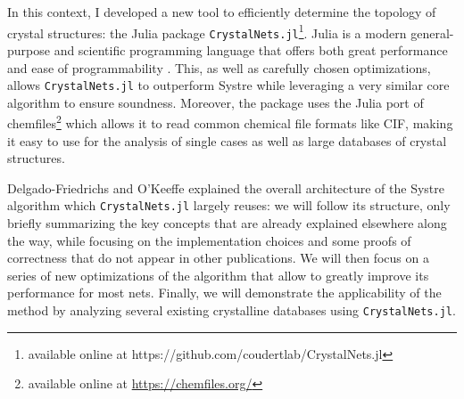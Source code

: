 \documentclass[main.tex]{subfiles}
\begin{document}

\medskip

In this context, I developed a new tool to efficiently determine the topology of crystal structures: the Julia package \texttt{CrystalNets.jl}\footnote{available online at https://github.com/coudertlab/CrystalNets.jl}. Julia \autocite{Julia} is a modern general-purpose and scientific programming language that offers both great performance and ease of programmability \autocite{JuliaDesign}. This, as well as carefully chosen optimizations, allows \texttt{CrystalNets.jl} to outperform Systre while leveraging a very similar core algorithm to ensure soundness. Moreover, the package uses the Julia port of chemfiles\footnote{available online at \url{https://chemfiles.org/}} which allows it to read common chemical file formats like CIF, making it easy to use for the analysis of single cases as well as large databases of crystal structures.

Delgado-Friedrichs and O'Keeffe \autocite{Systre} explained the overall architecture of the Systre algorithm which \texttt{CrystalNets.jl} largely reuses: we will follow its structure, only briefly summarizing the key concepts that are already explained elsewhere along the way, while focusing on the implementation choices and some proofs of correctness that do not appear in other publications. We will then focus on a series of new optimizations of the algorithm that allow to greatly improve its performance for most nets. Finally, we will demonstrate the applicability of the method by analyzing several existing crystalline databases using \texttt{CrystalNets.jl}.
\end{document}
